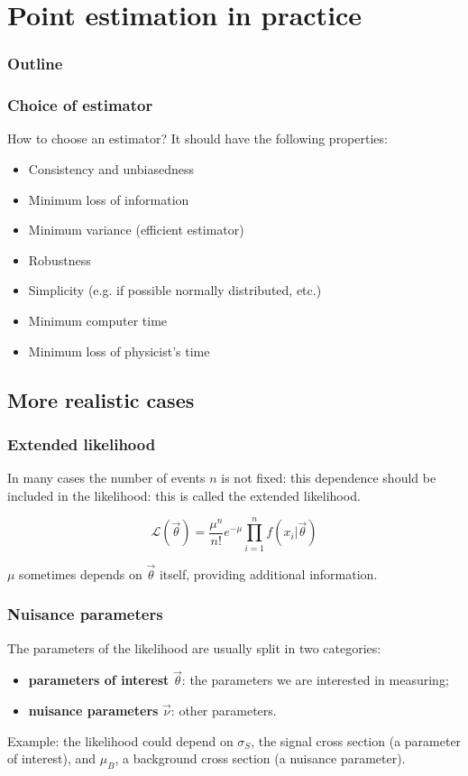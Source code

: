 \documentclass[9pt]{beamer}
\begin{document}
\section{Point estimation in practice}

\begin{frame}
 \frametitle{Outline}
 
 \tableofcontents[current]
\end{frame}

\begin{frame}
 \frametitle{Choice of estimator}
 How to choose an estimator? It should have the following properties:
 
 \begin{itemize}
  \item Consistency and unbiasedness
  \item Minimum loss of information
  \item Minimum variance (efficient estimator)
  \item Robustness
  \item Simplicity (e.g. if possible normally distributed, etc.)
  \item Minimum computer time
  \item Minimum loss of physicist's time
 \end{itemize}

\end{frame}

\subsection{More realistic cases}


\begin{frame}
 \frametitle{Extended likelihood}
 
 In many cases the number of events $n$ is not fixed: this dependence should be included in the likelihood: this is called the extended likelihood.
 
 $$\mathcal{L}(\vec{\theta}) = \frac{\mu^n}{n!}e^{-\mu} \prod_{i=1}^{n} f(x_i | \vec{\theta})$$
 
 $\mu$ sometimes depends on $\vec{\theta}$ itself, providing additional information.
\end{frame}

\begin{frame}
 \frametitle{Nuisance parameters}
 
 The parameters of the likelihood are usually split in two categories:
 
 \begin{itemize}
  \item \textbf{parameters of interest} $\vec{\theta}$: the parameters we are interested in measuring;
  \item \textbf{nuisance parameters} $\vec{\nu}$: other parameters.
 \end{itemize}
 
 Example: the likelihood could depend on $\sigma_S$, the signal cross section (a parameter of interest), and $\mu_B$, a background cross section (a nuisance parameter).

\end{frame}
\end{document}
